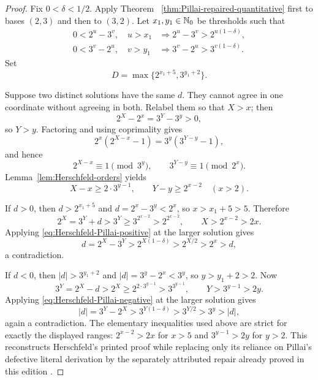 \begin{proof}
Fix $0<\delta<1/2$.  Apply Theorem~
\ref{thm:Pillai-repaired-quantitative} first to bases $(2,3)$ and then to
$(3,2)$.  Let $x_1,y_1\in\mathbb{N}_{0}$ be thresholds such that
\begin{align}
 0<2^u-3^v,\quad u>x_1
 &\Longrightarrow 2^u-3^v>2^{u(1-\delta)},
 \label{eq:Herschfeld-Pillai-positive}\\
 0<3^v-2^u,\quad v>y_1
 &\Longrightarrow 3^v-2^u>3^{v(1-\delta)}.
 \label{eq:Herschfeld-Pillai-negative}
\end{align}
Set
\begin{equation}
\label{eq:Herschfeld-threshold}
 D=\max\{2^{x_1+5},3^{y_1+2}\}.
\end{equation}

Suppose two distinct solutions have the same $d$.  They cannot agree in one
coordinate without agreeing in both.  Relabel them so that $X>x$; then
\[
 2^X-2^x=3^Y-3^y>0,
\]
so $Y>y$.  Factoring and using coprimality gives
\begin{equation}
\label{eq:Herschfeld-two-solution-factorization}
 2^x(2^{X-x}-1)=3^y(3^{Y-y}-1),
\end{equation}
and hence
\begin{equation}
\label{eq:Herschfeld-two-orders}
 2^{X-x}\equiv1\pmod{3^y},
 \qquad
 3^{Y-y}\equiv1\pmod{2^x}.
\end{equation}
Lemma~\ref{lem:Herschfeld-orders} yields
\begin{equation}
\label{eq:Herschfeld-exponent-separation}
 X-x\geq2\cdot3^{y-1},
 \qquad
 Y-y\geq2^{x-2}\quad(x>2).
\end{equation}

If $d>0$, then $d>2^{x_1+5}$ and
$d=2^x-3^y<2^x$, so $x>x_1+5>5$.  Therefore
\[
 2^X=3^Y+d>3^Y
 \geq3^{2^{x-2}}>2^{2^{x-2}},
 \qquad X>2^{x-2}>2x.
\]
Applying \eqref{eq:Herschfeld-Pillai-positive} at the larger solution gives
\[
 d=2^X-3^Y>2^{X(1-\delta)}>2^{X/2}>2^x>d,
\]
a contradiction.

If $d<0$, then $|d|>3^{y_1+2}$ and
$|d|=3^y-2^x<3^y$, so $y>y_1+2>2$.  Now
\[
 3^Y=2^X-d>2^X
 \geq2^{2\cdot3^{y-1}}>3^{3^{y-1}},
 \qquad Y>3^{y-1}>2y.
\]
Applying \eqref{eq:Herschfeld-Pillai-negative} at the larger solution gives
\[
 |d|=3^Y-2^X>3^{Y(1-\delta)}>3^{Y/2}>3^y>|d|,
\]
again a contradiction.  The elementary inequalities used above are strict
for exactly the displayed ranges: $2^{x-2}>2x$ for $x>5$ and
$3^{y-1}>2y$ for $y>2$.  This reconstructs Herschfeld's printed proof while
replacing only its reliance on Pillai's defective literal derivation by the
separately attributed repair already proved in this edition
\cite[pp.~233--234]{Herschfeld1936}.
\end{proof}

